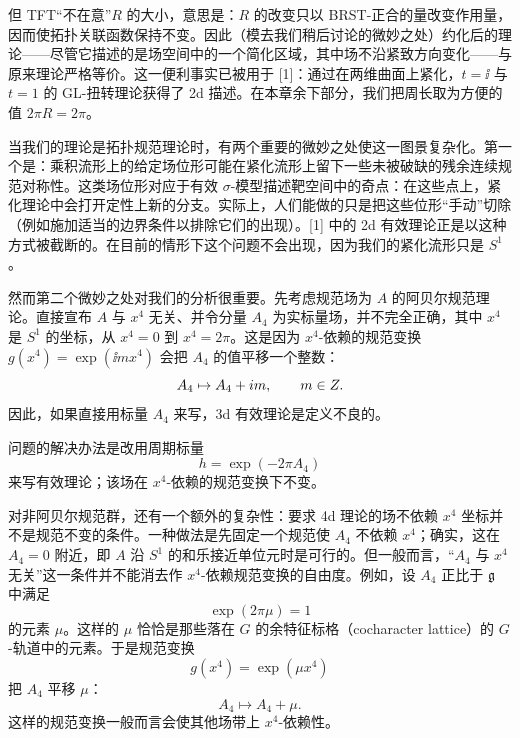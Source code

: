 但 TFT“不在意”$R$ 的大小，意思是：$R$ 的改变只以 BRST-正合的量改变作用量，因而使拓扑关联函数保持不变。因此（模去我们稍后讨论的微妙之处）约化后的理论——尽管它描述的是场空间中的一个简化区域，其中场不沿紧致方向变化——与原来理论严格等价。这一便利事实已被用于 [1]：通过在两维曲面上紧化，$t=\ii$ 与 $t=1$ 的 GL-扭转理论获得了 2d 描述。在本章余下部分，我们把周长取为方便的值 $2\pi R=2\pi$。

当我们的理论是拓扑规范理论时，有两个重要的微妙之处使这一图景复杂化。第一个是：乘积流形上的给定场位形可能在紧化流形上留下一些未被破缺的残余连续规范对称性。这类场位形对应于有效 $\sigma$-模型描述靶空间中的奇点：在这些点上，紧化理论中会打开定性上新的分支。实际上，人们能做的只是把这些位形“手动”切除（例如施加适当的边界条件以排除它们的出现）。[1] 中的 2d 有效理论正是以这种方式被截断的。在目前的情形下这个问题不会出现，因为我们的紧化流形只是 $S^1$。

然而第二个微妙之处对我们的分析很重要。先考虑规范场为 $A$ 的阿贝尔规范理论。直接宣布 $A$ 与 $x^4$ 无关、并令分量 $A_4$ 为实标量场，并不完全正确，其中 $x^4$ 是 $S^1$ 的坐标，从 $x^4=0$ 到 $x^4=2\pi$。这是因为 $x^4$-依赖的规范变换 $g(x^4)=\exp(\ii mx^4)$ 会把 $A_4$ 的值平移一个整数：
\[
    A_4 \mapsto A_4 + i m, \qquad m \in Z .
\]
因此，如果直接用标量 $A_4$ 来写，3d 有效理论是定义不良的。

问题的解决办法是改用周期标量
\[
    h = \exp(-2\pi A_4)
\]
来写有效理论；该场在 $x^4$-依赖的规范变换下不变。

对非阿贝尔规范群，还有一个额外的复杂性：要求 4d 理论的场不依赖 $x^4$ 坐标并不是规范不变的条件。一种做法是先固定一个规范使 $A_4$ 不依赖 $x^4$；确实，这在 $A_4=0$ 附近，即 $A$ 沿 $S^1$ 的和乐接近单位元时是可行的。但一般而言，“$A_4$ 与 $x^4$ 无关”这一条件并不能消去作 $x^4$-依赖规范变换的自由度。例如，设 $A_4$ 正比于 $\mathfrak{g}$ 中满足
\[
    \exp(2\pi\mu) = 1
\]
的元素 $\mu$。这样的 $\mu$ 恰恰是那些落在 $G$ 的余特征标格（cocharacter lattice）的 $G$-轨道中的元素。于是规范变换
\[
    g(x^4) = \exp(\mu x^4)
\]
把 $A_4$ 平移 $\mu$：
\[
    A_4 \mapsto A_4 + \mu .
\]
这样的规范变换一般而言会使其他场带上 $x^4$-依赖性。


